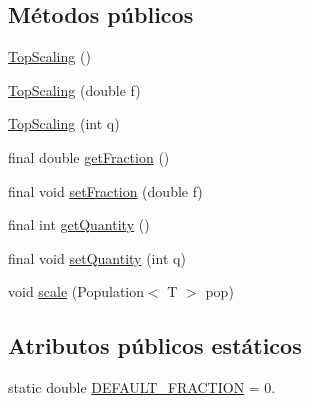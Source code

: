 \subsection*{Métodos públicos}
\begin{DoxyCompactItemize}
\item 
\hyperlink{classjenes_1_1stage_1_1operator_1_1common_1_1_top_scaling_3_01_t_01extends_01_chromosome_01_4_aa1be76204f86d57efff77e708cbcf2f9}{Top\-Scaling} ()
\item 
\hyperlink{classjenes_1_1stage_1_1operator_1_1common_1_1_top_scaling_3_01_t_01extends_01_chromosome_01_4_acb9c77ba5c63f60dcb5d27cf256c6d61}{Top\-Scaling} (double f)
\item 
\hyperlink{classjenes_1_1stage_1_1operator_1_1common_1_1_top_scaling_3_01_t_01extends_01_chromosome_01_4_adb3a002d09932e82a52f848cd4b8247e}{Top\-Scaling} (int q)
\item 
final double \hyperlink{classjenes_1_1stage_1_1operator_1_1common_1_1_top_scaling_3_01_t_01extends_01_chromosome_01_4_a4cb1be9e4948570a5f5d94ed97eb6cba}{get\-Fraction} ()
\item 
final void \hyperlink{classjenes_1_1stage_1_1operator_1_1common_1_1_top_scaling_3_01_t_01extends_01_chromosome_01_4_ab39c283ff0bb662ac76df11474ef133f}{set\-Fraction} (double f)
\item 
final int \hyperlink{classjenes_1_1stage_1_1operator_1_1common_1_1_top_scaling_3_01_t_01extends_01_chromosome_01_4_a165fa24c31055aecd832e837419bad6f}{get\-Quantity} ()
\item 
final void \hyperlink{classjenes_1_1stage_1_1operator_1_1common_1_1_top_scaling_3_01_t_01extends_01_chromosome_01_4_a53e27151e7c9b0b98e5c80e5018d2800}{set\-Quantity} (int q)
\item 
void \hyperlink{classjenes_1_1stage_1_1operator_1_1common_1_1_top_scaling_3_01_t_01extends_01_chromosome_01_4_afb5fd14e2cdb722a139193172c56ceaa}{scale} (Population$<$ T $>$ pop)
\end{DoxyCompactItemize}
\subsection*{Atributos públicos estáticos}
\begin{DoxyCompactItemize}
\item 
static double \hyperlink{classjenes_1_1stage_1_1operator_1_1common_1_1_top_scaling_3_01_t_01extends_01_chromosome_01_4_af21f9346a23ebaab4d7a5bd4367edafe}{D\-E\-F\-A\-U\-L\-T\-\_\-\-F\-R\-A\-C\-T\-I\-O\-N} = 0.
\end{DoxyCompactItemize}


